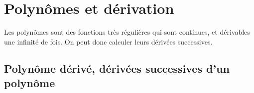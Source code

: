 \documentclass[a4paper, 11pt,reqno]{article}
\begin{document}
{\begin{exercice}
\begin{enumerate}
		\end{enumerate}
	\end{exercice}
}

% 

\section{Polyn\^omes et d\'erivation}

\noindent Les polyn\^omes sont des fonctions tr\`es r\'eguli\`eres qui sont continues, et d\'erivables une infinit\'e de fois. On peut donc calculer leurs  d\'eriv\'ees successives.


\subsection{Polyn\^ome d\'eriv\'e, d\'eriv\'ees successives d'un polyn\^ome}
\end{document}
